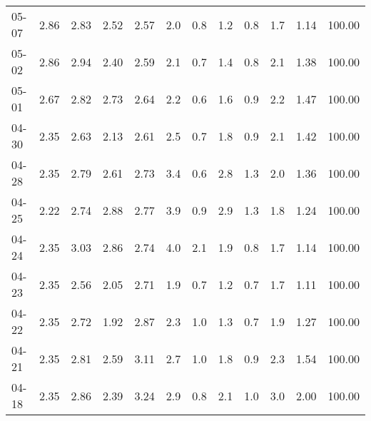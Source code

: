\begin{threeparttable}
{\begin{tabular}{lrrrrrrrrrrr}
  05-07 &          2.86 &          2.83 &          2.52 &        2.57 &                 2.0 &                 0.8 &        1.2 &                 0.8 &              1.7 &            1.14 &                 100.00 \\
  05-02 &          2.86 &          2.94 &          2.40 &        2.59 &                 2.1 &                 0.7 &        1.4 &                 0.8 &              2.1 &            1.38 &                 100.00 \\
  05-01 &          2.67 &          2.82 &          2.73 &        2.64 &                 2.2 &                 0.6 &        1.6 &                 0.9 &              2.2 &            1.47 &                 100.00 \\
  04-30 &          2.35 &          2.63 &          2.13 &        2.61 &                 2.5 &                 0.7 &        1.8 &                 0.9 &              2.1 &            1.42 &                 100.00 \\
  04-28 &          2.35 &          2.79 &          2.61 &        2.73 &                 3.4 &                 0.6 &        2.8 &                 1.3 &              2.0 &            1.36 &                 100.00 \\
  04-25 &          2.22 &          2.74 &          2.88 &        2.77 &                 3.9 &                 0.9 &        2.9 &                 1.3 &              1.8 &            1.24 &                 100.00 \\
  04-24 &          2.35 &          3.03 &          2.86 &        2.74 &                 4.0 &                 2.1 &        1.9 &                 0.8 &              1.7 &            1.14 &                 100.00 \\
  04-23 &          2.35 &          2.56 &          2.05 &        2.71 &                 1.9 &                 0.7 &        1.2 &                 0.7 &              1.7 &            1.11 &                 100.00 \\
  04-22 &          2.35 &          2.72 &          1.92 &        2.87 &                 2.3 &                 1.0 &        1.3 &                 0.7 &              1.9 &            1.27 &                 100.00 \\
  04-21 &          2.35 &          2.81 &          2.59 &        3.11 &                 2.7 &                 1.0 &        1.8 &                 0.9 &              2.3 &            1.54 &                 100.00 \\
  04-18 &          2.35 &          2.86 &          2.39 &        3.24 &                 2.9 &                 0.8 &        2.1 &                 1.0 &              3.0 &            2.00 &                 100.00 \\

\end{tabular}}
\end{threeparttable}
